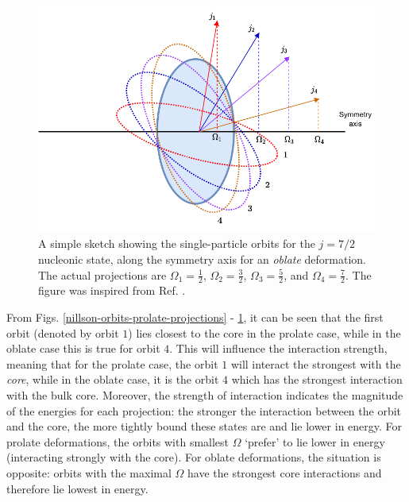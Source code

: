 \begin{figure}
    \centering
    \includegraphics[scale=1]{Chapters/Figures/nillson_SP_orbits_2.pdf}
    \caption{A simple sketch showing the single-particle orbits for the $j=7/2$ nucleonic state, along the symmetry axis for an \emph{oblate} deformation. The actual projections are $\Omega_1=\frac{1}{2}$, $\Omega_2=\frac{3}{2}$, $\Omega_3=\frac{5}{2}$, and $\Omega_4=\frac{7}{2}$. The figure was inspired from Ref. \cite{krane1991introductory}.}
    \label{nillson-orbits-oblate-projections}
\end{figure}

From Figs. \ref{nillson-orbits-prolate-projections} - \ref{nillson-orbits-oblate-projections}, it can be seen that the first orbit (denoted by orbit $1$) lies closest to the core in the prolate case, while in the oblate case this is true for orbit $4$. This will influence the interaction strength, meaning that for the prolate case, the orbit $1$ will interact the strongest with the \emph{core}, while in the oblate case, it is the orbit $4$ which has the strongest interaction with the bulk core. Moreover, the strength of interaction indicates the magnitude of the energies for each projection: the stronger the interaction between the orbit and the core, the more tightly bound these states are and lie lower in energy. For prolate deformations, the orbits with smallest $\Omega$ `prefer' to lie lower in energy (interacting strongly with the core). For oblate deformations, the situation is opposite: orbits with the maximal $\Omega$ have the strongest core interactions and therefore lie lowest in energy.

